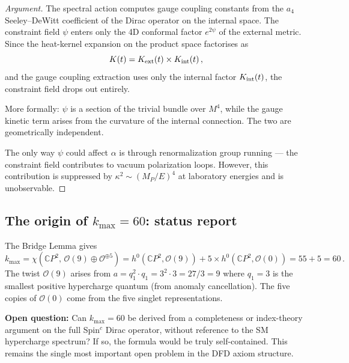 \documentclass[11pt,a4paper]{article}
\newcommand{\CP}{\mathbb{C}P}
\begin{document}
\begin{proof}[Argument]
The spectral action computes gauge coupling constants from the $a_4$ Seeley--DeWitt coefficient of the Dirac operator on the internal space. The constraint field $\psi$ enters only the 4D conformal factor $e^{2\psi}$ of the external metric. Since the heat-kernel expansion on the product space factorises as
\[
K(t) = K_{\rm ext}(t) \times K_{\rm int}(t)\,,
\]
and the gauge coupling extraction uses only the internal factor $K_{\rm int}(t)$, the constraint field drops out entirely.

More formally: $\psi$ is a section of the trivial bundle over $M^4$, while the gauge kinetic term arises from the curvature of the internal connection. The two are geometrically independent.

The only way $\psi$ could affect $\alpha$ is through renormalization group running --- the constraint field contributes to vacuum polarization loops. However, this contribution is suppressed by $\kappa^2 \sim (M_P/E)^4$ at laboratory energies and is unobservable.
\end{proof}

\subsection{The origin of $k_{\max} = 60$: status report}

The Bridge Lemma gives
\[
k_{\max} = \chi(\CP^2,\, \mathcal{O}(9) \oplus \mathcal{O}^{\oplus 5}) = h^0(\CP^2, \mathcal{O}(9)) + 5 \times h^0(\CP^2, \mathcal{O}(0)) = 55 + 5 = 60\,.
\]
The twist $\mathcal{O}(9)$ arises from $a = q_1^2 \cdot q_1 = 3^2 \cdot 3 = 27/3 = 9$ where $q_1 = 3$ is the smallest positive hypercharge quantum (from anomaly cancellation). The five copies of $\mathcal{O}(0)$ come from the five singlet representations.

\textbf{Open question:} Can $k_{\max} = 60$ be derived from a completeness or index-theory argument on the full Spin$^c$ Dirac operator, without reference to the SM hypercharge spectrum? If so, the formula would be truly self-contained. This remains the single most important open problem in the DFD axiom structure.
\end{document}
